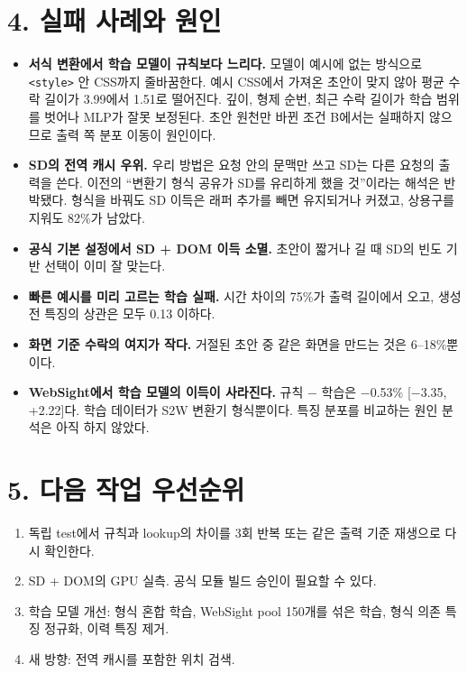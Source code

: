 \documentclass[10pt,a4paper]{article}
\begin{document}
\section*{4. 실패 사례와 원인}
\begin{itemize}[leftmargin=1.2em]
\item \textbf{서식 변환에서 학습 모델이 규칙보다 느리다.} 모델이 예시에 없는 방식으로 \texttt{<style>} 안 CSS까지 줄바꿈한다. 예시 CSS에서 가져온 초안이 맞지 않아 평균 수락 길이가 3.99에서 1.51로 떨어진다. 깊이, 형제 순번, 최근 수락 길이가 학습 범위를 벗어나 MLP가 잘못 보정된다. 초안 원천만 바뀐 조건 B에서는 실패하지 않으므로 출력 쪽 분포 이동이 원인이다.
\item \textbf{SD의 전역 캐시 우위.} 우리 방법은 요청 안의 문맥만 쓰고 SD는 다른 요청의 출력을 쓴다. 이전의 ``변환기 형식 공유가 SD를 유리하게 했을 것''이라는 해석은 반박됐다. 형식을 바꿔도 SD 이득은 래퍼 추가를 빼면 유지되거나 커졌고, 상용구를 지워도 82\%가 남았다.
\item \textbf{공식 기본 설정에서 SD + DOM 이득 소멸.} 초안이 짧거나 길 때 SD의 빈도 기반 선택이 이미 잘 맞는다.
\item \textbf{빠른 예시를 미리 고르는 학습 실패.} 시간 차이의 75\%가 출력 길이에서 오고, 생성 전 특징의 상관은 모두 0.13 이하다.
\item \textbf{화면 기준 수락의 여지가 작다.} 거절된 초안 중 같은 화면을 만드는 것은 6--18\%뿐이다.
\item \textbf{WebSight에서 학습 모델의 이득이 사라진다.} 규칙 − 학습은 −0.53\% [−3.35, +2.22]다. 학습 데이터가 S2W 변환기 형식뿐이다. 특징 분포를 비교하는 원인 분석은 아직 하지 않았다.
\end{itemize}

\section*{5. 다음 작업 우선순위}
\begin{enumerate}[leftmargin=1.3em]
\item 독립 test에서 규칙과 lookup의 차이를 3회 반복 또는 같은 출력 기준 재생으로 다시 확인한다.
\item SD + DOM의 GPU 실측. 공식 모듈 빌드 승인이 필요할 수 있다.
\item 학습 모델 개선: 형식 혼합 학습, WebSight pool 150개를 섞은 학습, 형식 의존 특징 정규화, 이력 특징 제거.
\item 새 방향: 전역 캐시를 포함한 위치 검색.
\end{enumerate}
\end{document}
